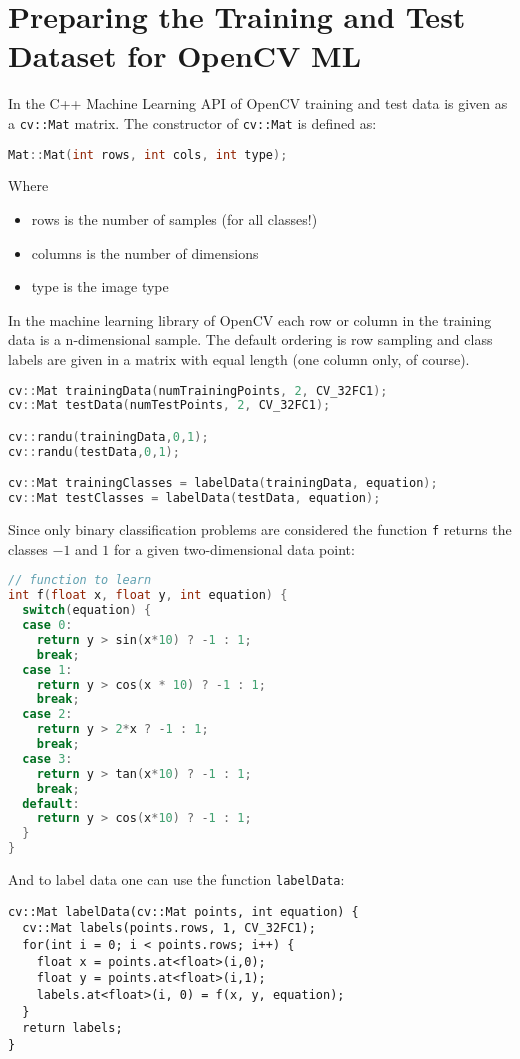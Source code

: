 \section{Preparing the Training and Test Dataset for OpenCV ML}
In the C++ Machine Learning API of OpenCV training and test data is given as a \lstinline|cv::Mat| matrix. The constructor of \lstinline|cv::Mat| is defined as:
\begin{lstlisting}[language=C++]
Mat::Mat(int rows, int cols, int type);
\end{lstlisting}
Where
\begin{itemize}
 \item rows is the number of samples (for all classes!)
 \item columns is the number of dimensions
 \item type is the image type
\end{itemize}

In the machine learning library of OpenCV each row or column in the training data is a n-dimensional sample. The default ordering is row sampling and class labels are given in a matrix with equal length (one column only, of course). 

\begin{lstlisting}[language=C++]
cv::Mat trainingData(numTrainingPoints, 2, CV_32FC1);
cv::Mat testData(numTestPoints, 2, CV_32FC1);

cv::randu(trainingData,0,1);
cv::randu(testData,0,1);

cv::Mat trainingClasses = labelData(trainingData, equation);
cv::Mat testClasses = labelData(testData, equation);
\end{lstlisting}

Since only binary classification problems are considered the function \lstinline|f| returns the classes $-1$ and $1$ for a given two-dimensional data point:

\begin{lstlisting}[language=C++]
// function to learn
int f(float x, float y, int equation) {
  switch(equation) {
  case 0:
    return y > sin(x*10) ? -1 : 1;
    break;
  case 1:
    return y > cos(x * 10) ? -1 : 1;
    break;
  case 2:
    return y > 2*x ? -1 : 1;
    break;
  case 3:
    return y > tan(x*10) ? -1 : 1;
    break;
  default:
    return y > cos(x*10) ? -1 : 1;
  }
}
\end{lstlisting}

And to label data one can use the function \lstinline|labelData|:
\begin{lstlisting}
cv::Mat labelData(cv::Mat points, int equation) {
  cv::Mat labels(points.rows, 1, CV_32FC1);
  for(int i = 0; i < points.rows; i++) {
    float x = points.at<float>(i,0);
    float y = points.at<float>(i,1);
    labels.at<float>(i, 0) = f(x, y, equation);
  }
  return labels;
}
\end{lstlisting}
